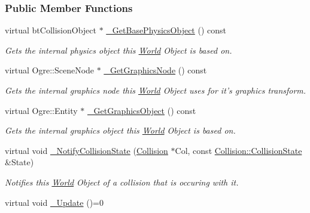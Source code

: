\subsubsection*{Public Member Functions}
\begin{DoxyCompactItemize}
\item 
virtual btCollisionObject $\ast$ \hyperlink{classMezzanine_1_1WorldObject_a4564b948a585aac1764ee13f2a61c110}{\_\-GetBasePhysicsObject} () const 
\begin{DoxyCompactList}\small\item\em Gets the internal physics object this \hyperlink{classMezzanine_1_1World}{World} Object is based on. \item\end{DoxyCompactList}\item 
virtual Ogre::SceneNode $\ast$ \hyperlink{classMezzanine_1_1WorldObject_a1123ace3f7730eaf1eb395b3aad714a4}{\_\-GetGraphicsNode} () const 
\begin{DoxyCompactList}\small\item\em Gets the internal graphics node this \hyperlink{classMezzanine_1_1World}{World} Object uses for it's graphics transform. \item\end{DoxyCompactList}\item 
virtual Ogre::Entity $\ast$ \hyperlink{classMezzanine_1_1WorldObject_ac01aba8d4eff2df4e68bb15e5b086660}{\_\-GetGraphicsObject} () const 
\begin{DoxyCompactList}\small\item\em Gets the internal graphics object this \hyperlink{classMezzanine_1_1World}{World} Object is based on. \item\end{DoxyCompactList}\item 
virtual void \hyperlink{classMezzanine_1_1WorldObject_aacf9e82bfb2f25ee309a1871a2032030}{\_\-NotifyCollisionState} (\hyperlink{classMezzanine_1_1Collision}{Collision} $\ast$Col, const \hyperlink{classMezzanine_1_1Collision_a24094c597061743dcd571f36077f4d19}{Collision::CollisionState} \&State)
\begin{DoxyCompactList}\small\item\em Notifies this \hyperlink{classMezzanine_1_1World}{World} Object of a collision that is occuring with it. \item\end{DoxyCompactList}\item 
\hypertarget{classMezzanine_1_1WorldObject_af54c2dd470b534a51f12baae51631359}{
virtual void \hyperlink{classMezzanine_1_1WorldObject_af54c2dd470b534a51f12baae51631359}{\_\-Update} ()=0}
\label{classMezzanine_1_1WorldObject_af54c2dd470b534a51f12baae51631359}


\end{DoxyCompactItemize}
